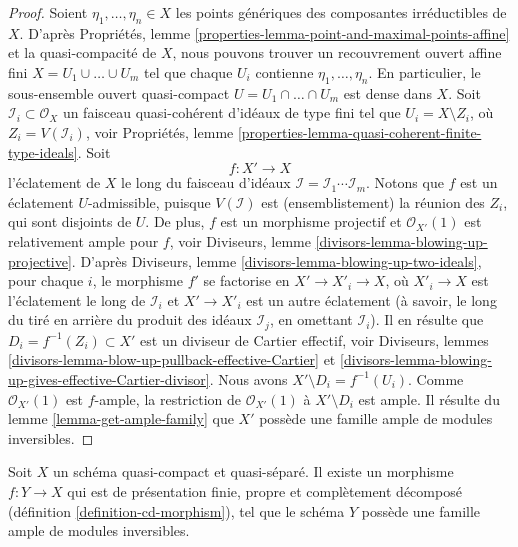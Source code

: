 \begin{proof}
Soient $\eta_1, \ldots, \eta_n \in X$ les points génériques des
composantes irréductibles de $X$. D'après
Propriétés, lemme \ref{properties-lemma-point-and-maximal-points-affine}
et la quasi-compacité de $X$, nous pouvons trouver un recouvrement ouvert affine
fini $X = U_1 \cup \ldots \cup U_m$ tel que
chaque $U_i$ contienne $\eta_1, \ldots, \eta_n$. En particulier,
le sous-ensemble ouvert quasi-compact $U = U_1 \cap \ldots \cap U_m$ est dense dans $X$.
Soit $\mathcal{I}_i \subset \mathcal{O}_X$ un faisceau quasi-cohérent d'idéaux de type
fini tel que $U_i = X \setminus Z_i$, où $Z_i = V(\mathcal{I}_i)$,
voir Propriétés, lemme \ref{properties-lemma-quasi-coherent-finite-type-ideals}.
Soit
$$
f : X' \longrightarrow X
$$
l'éclatement de $X$ le long du faisceau d'idéaux
$\mathcal{I} = \mathcal{I}_1 \cdots \mathcal{I}_m$.
Notons que $f$ est un éclatement $U$-admissible, puisque $V(\mathcal{I})$
est (ensemblistement) la réunion des $Z_i$, qui sont disjoints de $U$.
De plus, $f$ est un morphisme projectif et
$\mathcal{O}_{X'}(1)$ est relativement ample pour $f$, voir
Diviseurs, lemme \ref{divisors-lemma-blowing-up-projective}.
D'après Diviseurs, lemme \ref{divisors-lemma-blowing-up-two-ideals},
pour chaque $i$, le morphisme $f'$ se factorise en $X' \to X'_i \to X$,
où $X'_i \to X$ est l'éclatement le long de $\mathcal{I}_i$
et $X' \to X'_i$ est un autre éclatement (à savoir, le long du tiré en arrière
du produit des idéaux $\mathcal{I}_j$, en omettant $\mathcal{I}_i$).
Il en résulte que $D_i = f^{-1}(Z_i) \subset X'$ est un diviseur de Cartier
effectif, voir
Diviseurs, lemmes \ref{divisors-lemma-blow-up-pullback-effective-Cartier} et
\ref{divisors-lemma-blowing-up-gives-effective-Cartier-divisor}.
Nous avons $X' \setminus D_i = f^{-1}(U_i)$. Comme $\mathcal{O}_{X'}(1)$ est
$f$-ample, la restriction de
$\mathcal{O}_{X'}(1)$ à $X' \setminus D_i$ est ample. Il résulte du
lemme \ref{lemma-get-ample-family}
que $X'$ possède une famille ample de modules inversibles.
\end{proof}

\begin{proposition}
\label{proposition-envelope-with-resolution-property}
Soit $X$ un schéma quasi-compact et quasi-séparé. Il existe un
morphisme $f : Y \to X$ qui est de présentation finie, propre et
complètement décomposé (définition \ref{definition-cd-morphism}),
tel que le schéma $Y$ possède une famille ample de modules inversibles.
\end{proposition}

